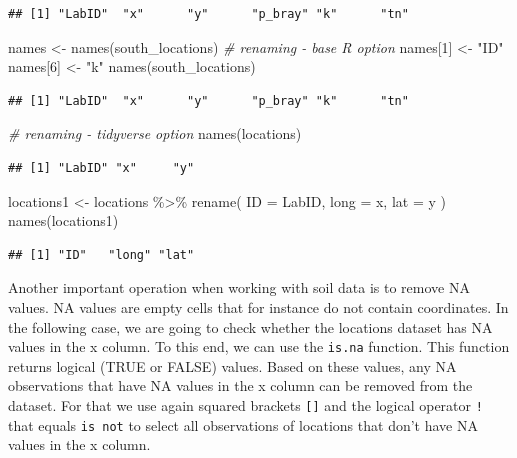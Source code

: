 \documentclass[
  10pt,
  b5paper,
  oneside]{book}
\newenvironment{Shaded}{\begin{snugshade}}{\end{snugshade}}
\newcommand{\AttributeTok}[1]{\textcolor[rgb]{0.77,0.63,0.00}{#1}}
\newcommand{\CommentTok}[1]{\textcolor[rgb]{0.56,0.35,0.01}{\textit{#1}}}
\newcommand{\DecValTok}[1]{\textcolor[rgb]{0.00,0.00,0.81}{#1}}
\newcommand{\FunctionTok}[1]{\textcolor[rgb]{0.00,0.00,0.00}{#1}}
\newcommand{\NormalTok}[1]{#1}
\newcommand{\OtherTok}[1]{\textcolor[rgb]{0.56,0.35,0.01}{#1}}
\newcommand{\SpecialCharTok}[1]{\textcolor[rgb]{0.00,0.00,0.00}{#1}}
\newcommand{\StringTok}[1]{\textcolor[rgb]{0.31,0.60,0.02}{#1}}
\begin{document}
\begin{verbatim}
## [1] "LabID"  "x"      "y"      "p_bray" "k"      "tn"
\end{verbatim}

\begin{Shaded}
\begin{Highlighting}[]
\NormalTok{names }\OtherTok{\textless{}{-}} \FunctionTok{names}\NormalTok{(south\_locations)}
\CommentTok{\# renaming {-} base R option}
\NormalTok{names[}\DecValTok{1}\NormalTok{] }\OtherTok{\textless{}{-}} \StringTok{"ID"}
\NormalTok{names[}\DecValTok{6}\NormalTok{] }\OtherTok{\textless{}{-}} \StringTok{"k"}
\FunctionTok{names}\NormalTok{(south\_locations)}
\end{Highlighting}
\end{Shaded}

\begin{verbatim}
## [1] "LabID"  "x"      "y"      "p_bray" "k"      "tn"
\end{verbatim}

\begin{Shaded}
\begin{Highlighting}[]
\CommentTok{\# renaming {-} tidyverse option}
\FunctionTok{names}\NormalTok{(locations)}
\end{Highlighting}
\end{Shaded}

\begin{verbatim}
## [1] "LabID" "x"     "y"
\end{verbatim}

\begin{Shaded}
\begin{Highlighting}[]
\NormalTok{locations1 }\OtherTok{\textless{}{-}}\NormalTok{ locations }\SpecialCharTok{\%\textgreater{}\%} \FunctionTok{rename}\NormalTok{(}
  \AttributeTok{ID =}\NormalTok{ LabID,}
  \AttributeTok{long =}\NormalTok{ x,}
  \AttributeTok{lat =}\NormalTok{ y}
\NormalTok{)}
\FunctionTok{names}\NormalTok{(locations1)}
\end{Highlighting}
\end{Shaded}

\begin{verbatim}
## [1] "ID"   "long" "lat"
\end{verbatim}

Another important operation when working with soil data is to remove NA values. NA values are empty cells that for instance do not contain coordinates. In the following case, we are going to check whether the locations dataset has NA values in the x column. To this end, we can use the \texttt{is.na} function. This function returns logical (TRUE or FALSE) values. Based on these values, any NA observations that have NA values in the x column can be removed from the dataset. For that we use again squared brackets \texttt{{[}{]}} and the logical operator \texttt{!} that equals \texttt{is\ not} to select all observations of locations that don't have NA values in the x column.
\end{document}
